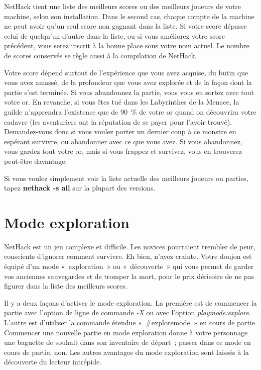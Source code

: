 \documentclass[titlepage]{article}
\begin{document}
NetHack tient une liste des meilleurs scores ou des meilleurs joueurs de
votre machine, selon son installation.
Dans le second cas, chaque compte de la machine ne peut avoir qu'un seul
score non gagnant dans la liste.
Si votre score dépasse celui de quelqu'un d'autre dans la liste, ou si vous
améliorez votre score précédent, vous serez inscrit à la bonne place sous
votre nom actuel.
Le nombre de scores conservés se règle aussi à la compilation de NetHack.


Votre score dépend surtout de l'expérience que vous avez acquise, du butin
que vous avez amassé, de la profondeur que vous avez explorée et de la
façon dont la partie s'est terminée.
Si vous abandonnez la partie, vous vous en sortez avec tout votre or.
En revanche, si vous êtes tué dans les Labyrinthes de la Menace, la guilde
n'apprendra l'existence que de 90~\% de votre or quand on découvrira votre
cadavre (les aventuriers ont la réputation de se payer pour l'avoir
trouvé).
Demandez-vous donc si vous voulez porter un dernier coup à ce monstre en
espérant survivre, ou abandonner avec ce que vous avez.
Si vous abandonnez, vous gardez tout votre or, mais si vous frappez et
survivez, vous en trouverez peut-être davantage.


Si vous voulez simplement voir la liste actuelle des meilleurs
joueurs ou parties, tapez \textbf{nethack -s all} sur la plupart des
versions.

\section{Mode exploration}



NetHack est un jeu complexe et difficile.
Les novices pourraient trembler de peur, conscients d'ignorer comment
survivre.
Eh bien, n'ayez crainte.
Votre donjon est équipé d'un mode «~exploration~» ou
«~découverte~» qui vous permet de garder vos anciennes sauvegardes
et de tromper la mort, pour le prix dérisoire de ne pas figurer dans la
liste des meilleurs scores.


Il y a deux façons d'activer le mode exploration.
La première est de commencer la partie avec l'option de ligne de commande
\textit{-X}
ou avec l'option
\textit{playmode:explore}.
L'autre est d'utiliser la commande étendue «~\#exploremode~» en
cours de partie.
Commencer une nouvelle partie en mode exploration donne à votre personnage
une baguette de souhait dans son inventaire de départ~; passer dans ce
mode en cours de partie, non.
Les autres avantages du mode exploration sont laissés à la découverte du
lecteur intrépide.
\end{document}
